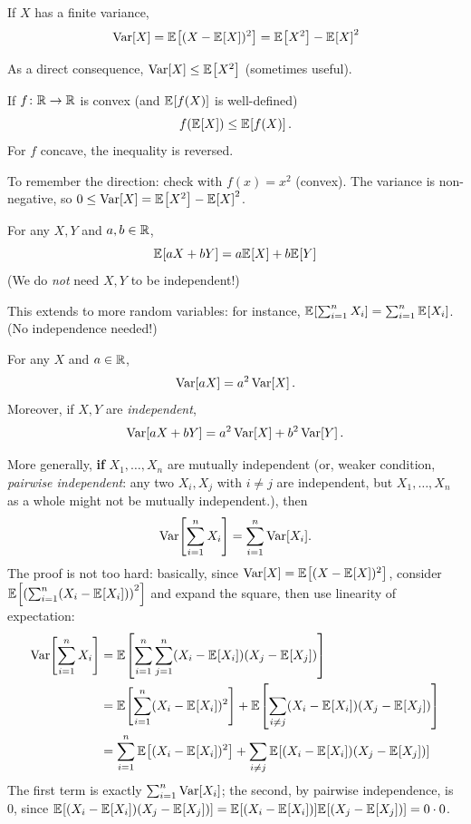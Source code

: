 \begin{fact}
If $X$ has a finite variance,
\[
\var[X] = \bEE{(X-\bEE{X})^2} = \bEE{X^2}-\bEE{X}^2
\]
\end{fact}
As a direct consequence, $\var[X]\leq \bEE{X^2}$ (sometimes useful).

\begin{lemma}
If $f\colon\mathbb{R}\to\mathbb{R}$ is convex (and $\bEE{f(X)}$ is well-defined)
\[
f(\bEE{X}) \leq \bEE{f(X)}\,.
\]
For $f$ concave, the inequality is reversed.
\end{lemma}
To remember the direction: check with $f(x)=x^2$ (convex). The variance is non-negative, so $0 \leq \var[X] = \bEE{X^2}-\bEE{X}^2$.

\begin{fact}
For any $X,Y$ and $a, b \in \mathbb{R}$,
\[
\bEE{aX+bY} = a\bEE{X}+b\bEE{Y}
\]
(We do \emph{not} need $X,Y$ to be independent!)
\end{fact}
\noindent This extends to more random variables: for instance, $\bEE{\sum_{i=1}^n X_i} = \sum_{i=1}^n \bEE{X_i}$. (No independence needed!)

\begin{fact}[Variance]
For any $X$ and $a \in \mathbb{R}$,
\[
\operatorname{Var}[aX] = a^2 \operatorname{Var}[X]\,.
\]
Moreover, if $X,Y$ are \emph{independent}, 
\[
\operatorname{Var}[aX+bY] = a^2 \operatorname{Var}[X]+b^2 \operatorname{Var}[Y]\,.
\]
\end{fact}
More generally, \textbf{if} $X_1,\dots, X_n$ are mutually independent (or, weaker condition, \emph{pairwise independent}: any two $X_i,X_j$ with $i\neq j$ are independent, but $X_1,\dots, X_n$ as a whole might not be mutually independent.), then
\begin{equation}
\var\mleft[\sum_{i=1}^n X_i\mright] = \sum_{i=1}^n \var[X_i].
\end{equation}
The proof is not too hard: basically, since $\var[X] = \bEE{(X-\bEE{X})^2}$, consider 
$\bEE{\Paren{\sum_{i=1}^n (X_i-\bEE{X_i})}^2}$ and expand the square, then use linearity of expectation:
\begin{align*}
\var\mleft[\sum_{i=1}^n X_i\mright] 
&= \bEE{\sum_{i=1}^n\sum_{j=1}^n (X_i-\bEE{X_i})(X_j-\bEE{X_j})} \\
&= \bEE{\sum_{i=1}^n(X_i-\bEE{X_i})^2} + \bEE{\sum_{i\neq j} (X_i-\bEE{X_i})(X_j-\bEE{X_j})}\\
&=\sum_{i=1}^n\bEE{(X_i-\bEE{X_i})^2} + \sum_{i\neq j} \bEE{(X_i-\bEE{X_i})(X_j-\bEE{X_j})}
\end{align*}
The first term is exactly $\sum_{i=1}^n\operatorname{Var}[X_i]$; the second, by pairwise independence, is 0, since $\bEE{(X_i-\bEE{X_i})(X_j-\bEE{X_j})} = \bEE{(X_i-\bEE{X_i})}\bEE{(X_j-\bEE{X_j})} = 0\cdot 0$.\medskip


